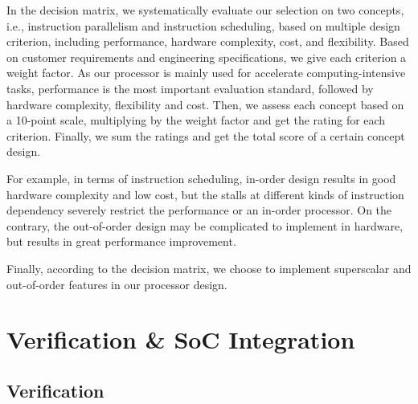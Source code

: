 In the decision matrix, we systematically evaluate our selection on two concepts, i.e., instruction parallelism and instruction scheduling, based on multiple design criterion, including performance, hardware complexity, cost, and flexibility. Based on customer requirements and engineering specifications, we give each criterion a weight factor. As our processor is mainly used for accelerate computing-intensive tasks, performance is the most important evaluation standard, followed by hardware complexity, flexibility and cost. Then, we assess each concept based on a 10-point scale, multiplying by the weight factor and get the rating for each criterion. Finally, we sum the ratings and get the total score of a certain concept design.

For example, in terms of instruction scheduling, in-order design results in good hardware complexity and low cost, but the stalls at different kinds of instruction dependency severely restrict the performance or an in-order processor. On the contrary, the out-of-order design may be complicated to implement in hardware, but results in great performance improvement.

Finally, according to the decision matrix, we choose to implement superscalar and out-of-order features in our processor design.


\section{Verification \& SoC Integration} %

\subsection{Verification}
